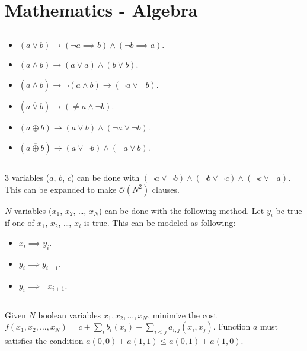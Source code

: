 \documentclass[landscape, 8pt, a4paper, oneside, twocolumn]{extarticle}
\begin{document}
\section{Mathematics - Algebra}
\subsection{}
\subsection{}
\begin{itemize}
	\item $(a \vee b) \to (\neg a \implies b) \wedge (\neg b \implies a)$.
	\item $(a \wedge b) \to (a \vee a) \wedge (b \vee b)$.
	\item $(a \overline{\wedge} b) \to \neg (a \wedge b) \to (\neg a \vee \neg b)$.
	\item $(a \overline{\vee} b) \to (\neq a \wedge \neg b)$.
	\item $(a \oplus b) \to (a \vee b) \wedge (\neg a \vee \neg b)$.
	\item $(a \overline{\oplus} b) \to (a \vee \neg b) \wedge (\neg a \vee b)$.
\end{itemize}
\subsection{}
$3$ variables ($a$, $b$, $c$) can be done with $(\neg a \vee \neg b) \wedge (\neg b \vee \neg c) \wedge (\neg c \vee \neg a)$. This can be expanded to make $\mathcal O(N^2)$ clauses.

$N$ variables ($x_1$, $x_2$, \ldots, $x_N$) can be done with the following method. Let $y_i$ be true if one of $x_1$, $x_2$, \ldots, $x_i$ is true. This can be modeled as following:
\begin{itemize}
	\item $x_i \implies y_i$.
	\item $y_i \implies y_{i+1}$.
	\item $y_i \implies \neg x_{i+1}$.
\end{itemize}
\subsection{}
Given $N$ boolean variables $x_{1}, x_{2}, \ldots, x_{N}$, minimize the cost $f(x_1, x_2, \ldots, x_N) = c + \sum_{i} b_i(x_i) + \sum_{i<j} a_{i,j}(x_i, x_j)$. Function $a$ must satisfies the condition $a(0,0) + a(1,1) \leq a(0,1) + a(1,0)$.
\end{document}
